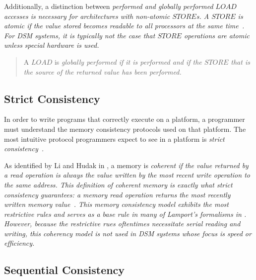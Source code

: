 \documentclass[10pt,conference]{IEEEtran}
\begin{document}
Additionally, a distinction between \em performed \em and \em globally performed \em $LOAD$ accesses is necessary for architectures with non-atomic $STORE$s.  A $STORE$ is atomic if the value stored becomes readable to all processors at the same time~\cite{Gharachorloo:1990:MCE:325164.325102}.  For DSM systems, it is typically not the case that $STORE$ operations are atomic unless special hardware is used.

\begin{quote}
\begin{definition}
A $LOAD$ is \em globally performed \em if it is performed \em and \em if the $STORE$ that is the source of the returned value has been performed.
\end{definition}
\end{quote}

\subsection{Strict Consistency}
In order to write programs that correctly execute on a platform, a programmer must understand the memory consistency protocols used on that platform.  The most intuitive protocol programmers expect to see in a platform is \em strict consistency\em~\cite{Goodman:1989:53705}.

As identified by Li and Hudak in \cite{Li:1989:MCS:75104.75105}, a memory is \em coherent \em if the value returned by a read operation is always the value written by the most recent write operation to the same address.  This definition of \em coherent \em memory is exactly what \em strict consistency \em guarantees: a memory read operation returns the most recently written memory value~\cite{Nitzberg:1991:DSM:112827.112855}.  This memory consistency model exhibits the most restrictive rules and serves as a base rule in many of Lamport's formalisms in \cite{Lamport:1979:MMC:1311099.1311750}.  However, because the restrictive rues oftentimes necessitate serial reading and writing, this coherency model is not used in DSM systems whose focus is speed or efficiency.

\subsection{Sequential Consistency}
\end{document}
